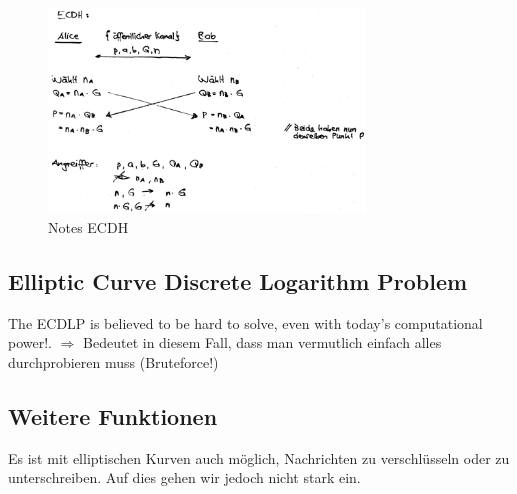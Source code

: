 \begin{figure}[H]
\centering
\includegraphics[width=0.75\textwidth]{figures/notesEcdh.png}
\caption{Notes ECDH}
\end{figure}

\hypertarget{elliptic-curve-discrete-logarithm-problem}{%
\subsection{Elliptic Curve Discrete Logarithm Problem}\label{elliptic-curve-discrete-logarithm-problem}}

The ECDLP is believed to be hard to solve, even with today's
computational power!. $\Rightarrow$ Bedeutet in diesem Fall, dass man vermutlich einfach alles durchprobieren muss (Bruteforce!)

\hypertarget{weitere-funktionen}{%
\subsection{Weitere Funktionen}\label{weitere-funktionen}}

Es ist mit elliptischen Kurven auch möglich, Nachrichten zu verschlüsseln oder zu unterschreiben. Auf dies gehen wir jedoch nicht stark ein.

\clearpage
